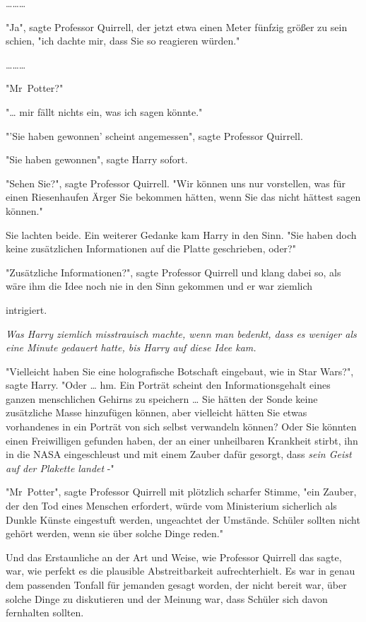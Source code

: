 {………

"Ja", sagte Professor Quirrell, der jetzt etwa einen Meter fünfzig größer zu sein schien, "ich dachte mir, dass Sie so reagieren würden."

………

"Mr~Potter?"

"… mir fällt nichts ein, was ich sagen könnte."

"'Sie haben gewonnen' scheint angemessen", sagte Professor Quirrell.

"Sie haben gewonnen", sagte Harry sofort.

"Sehen Sie?", sagte Professor Quirrell. "Wir können uns nur vorstellen, was für einen Riesenhaufen Ärger Sie bekommen hätten, wenn Sie das nicht hättest sagen können."

Sie lachten beide. Ein weiterer Gedanke kam Harry in den Sinn. "Sie haben doch keine zusätzlichen Informationen auf die Platte geschrieben, oder?"

"Zusätzliche Informationen?", sagte Professor Quirrell und klang dabei so, als wäre ihm die Idee noch nie in den Sinn gekommen und er war ziemlich

intrigiert.

\emph{Was Harry ziemlich misstrauisch machte, wenn man bedenkt, dass es weniger als eine Minute gedauert hatte, bis Harry auf diese Idee kam.}

"Vielleicht haben Sie eine holografische Botschaft eingebaut, wie in Star Wars?", sagte Harry. "Oder … hm. Ein Porträt scheint den Informationsgehalt eines ganzen menschlichen Gehirns zu speichern … Sie hätten der Sonde keine zusätzliche Masse hinzufügen können, aber vielleicht hätten Sie etwas vorhandenes in ein Porträt von sich selbst verwandeln können? Oder Sie könnten einen Freiwilligen gefunden haben, der an einer unheilbaren Krankheit stirbt, ihn in die NASA eingeschleust und mit einem Zauber dafür gesorgt, dass \emph{sein Geist auf der Plakette landet} -"

"Mr~Potter", sagte Professor Quirrell mit plötzlich scharfer Stimme, "ein Zauber, der den Tod eines Menschen erfordert, würde vom Ministerium sicherlich als Dunkle Künste eingestuft werden, ungeachtet der Umstände. Schüler sollten nicht gehört werden, wenn sie über solche Dinge reden."

Und das Erstaunliche an der Art und Weise, wie Professor Quirrell das sagte, war, wie perfekt es die plausible Abstreitbarkeit aufrechterhielt. Es war in genau dem passenden Tonfall für jemanden gesagt worden, der nicht bereit war, über solche Dinge zu diskutieren und der Meinung war, dass Schüler sich davon fernhalten sollten.

}
